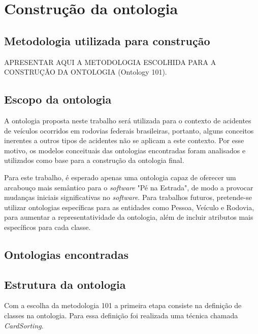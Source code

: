 \chapter{Construção da ontologia}

  \section{Metodologia utilizada para construção}
    
    APRESENTAR AQUI A METODOLOGIA ESCOLHIDA PARA A CONSTRUÇÃO DA ONTOLOGIA (Ontology 101).
    
  \section{Escopo da ontologia}
      
      A ontologia proposta neste trabalho será utilizada para o contexto de acidentes de veículos ocorridos em rodovias
      federais brasileiras, portanto, alguns conceitos inerentes a outros tipos de acidentes não se aplicam a este 
      contexto. Por esse motivo, os modelos conceituais das ontologias encontradas foram analisados e utilizados como base 
      para a construção da ontologia final.
      
      Para este trabalho, é esperado apenas uma ontologia capaz de oferecer um arcabouço mais semântico para o \textit{software} 
      "Pé na Estrada", de modo a provocar mudanças iniciais significativas no \textit{software}.
      Para trabalhos futuros, pretende-se utilizar ontologias específicas para as entidades como Pessoa, Veículo e Rodovia, para
      aumentar a representatividade da ontologia, além de incluir atributos mais específicos para cada classe.
    
  \section{Ontologias encontradas}
   
      
      
  \pagebreak
  \section{Estrutura da ontologia}

      Com a escolha da metodologia 101 a primeira etapa consiste na definição de classes na ontologia.
      Para essa definição foi realizada uma técnica chamada \textit{CardSorting}. 
      
